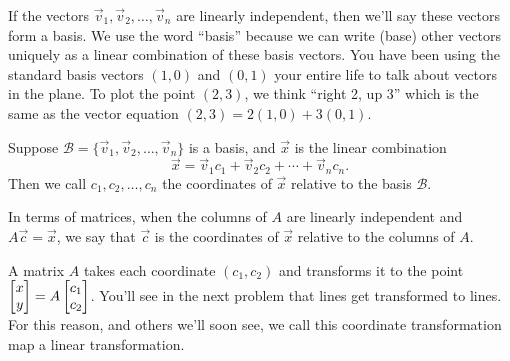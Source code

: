 \begin{definition}
 If the vectors $\vec v_1, \vec v_2,\ldots,\vec v_n$ are linearly independent, then we'll say these vectors form a basis.  
 We use the word ``basis'' because we can write (base) other vectors uniquely as a linear combination of these basis vectors.  You have been using the standard basis vectors $(1,0)$ and $(0,1)$ your entire life to talk about vectors in the plane. To plot the point $(2,3)$, we think ``right 2, up 3'' which is the same as the vector equation $(2,3)=2(1,0)+3(0,1)$. 

 Suppose $\mathscr{B}=\{\vec v_1, \vec v_2, \ldots, \vec v_n\}$ is a basis, and $\vec x$ is the linear combination
 $$\vec x = \vec v_1c_1+\vec v_2c_2+\cdots +\vec v_n c_n.$$
 Then we call $c_1, c_2, \ldots,c_n$ the coordinates of $\vec x$ relative to the basis $\mathscr{B}$. 
 
 In terms of matrices, when the columns of $A$ are linearly independent and $A\vec c=\vec x$, we say that $\vec c$ is the  coordinates of $\vec x$ relative to the columns of $A$. 
\end{definition}

A matrix $A$ takes each coordinate $(c_1,c_2)$ and transforms it to the point $\begin{bmatrix} x\\y \end{bmatrix}=A\begin{bmatrix} c_1\\c_2 \end{bmatrix}$. You'll see in the next problem that lines get transformed to lines. For this reason, and others we'll soon see,  we call this coordinate transformation map a linear transformation. 

